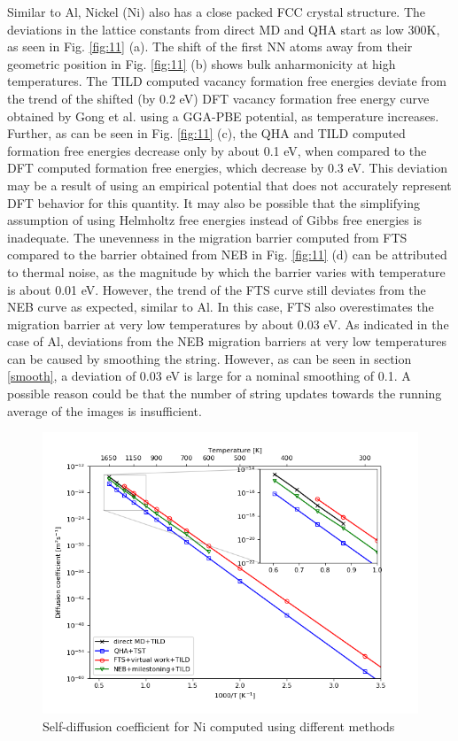 \documentclass{article}
\begin{document}
Similar to Al, Nickel (Ni) also has a close packed FCC crystal structure. The deviations in the lattice constants from direct MD and QHA start as low 300K, as seen in Fig. \ref{fig:11} (a). The shift of the first NN atoms away from their geometric position in Fig. \ref{fig:11} (b) shows bulk anharmonicity at high temperatures. The TILD computed vacancy formation free energies deviate from the trend of the shifted (by 0.2 eV) DFT vacancy formation free energy curve obtained by Gong et al. \cite{Gong2018} using a GGA-PBE potential, as temperature increases. Further, as can be seen in Fig. \ref{fig:11} (c), the QHA and TILD computed formation free energies decrease only by about 0.1 eV, when compared to the DFT computed formation free energies, which decrease by 0.3 eV. This deviation may be a result of using an empirical potential that does not accurately represent DFT behavior for this quantity. It may also be possible that the simplifying assumption of using Helmholtz free energies instead of Gibbs free energies is inadequate. The unevenness in the migration barrier computed from FTS compared to the barrier obtained from NEB in Fig. \ref{fig:11} (d) can be attributed to thermal noise, as the magnitude by which the barrier varies with temperature is about 0.01 eV. However, the trend of the FTS curve still deviates from the NEB curve as expected, similar to Al. In this case, FTS also overestimates the migration barrier at very low temperatures by about 0.03 eV. As indicated in the case of Al, deviations from the NEB migration barriers at very low temperatures can be caused by smoothing the string. However, as can be seen in section \ref{smooth}, a deviation of 0.03 eV is large for a nominal smoothing of 0.1. A possible reason could be that the number of string updates towards the running average of the images is insufficient.

\begin{figure}[htp]
\centering
\includegraphics[scale=0.65]{ni_self_diffusion}
\caption{Self-diffusion coefficient for Ni computed using different methods}
\label{fig:12}
\end{figure}
\end{document}
